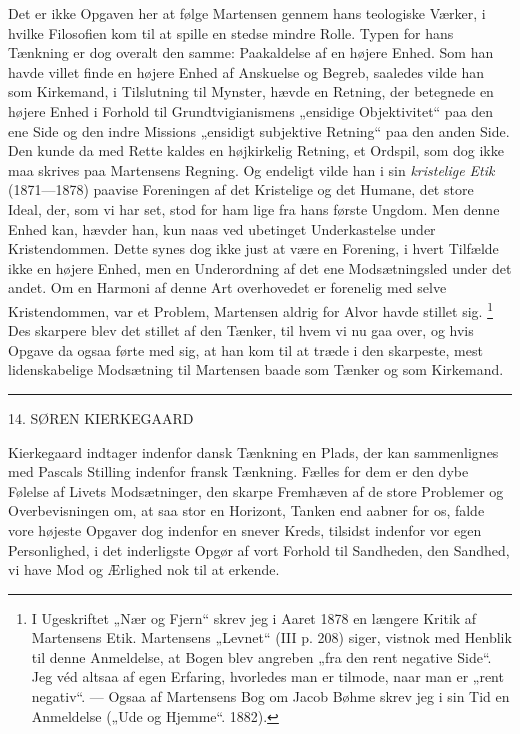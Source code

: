 \documentclass[12pt,a4paper,openany]{book}
\newcommand{\opage}[1]{\marginnote{\footnotesize\textit{[#1]}}}
\begin{document}
Det er ikke Opgaven her at følge Martensen gennem hans teologiske Værker, i
hvilke Filosofien kom til at spille en stedse mindre Rolle. Typen for hans
Tænkning er dog overalt den samme: Paakaldelse af en højere Enhed. Som han
havde villet finde en højere Enhed af Anskuelse og Begreb, saaledes vilde han
som Kirkemand, i Tilslutning til Mynster, hævde en Retning, der betegnede en
højere Enhed i Forhold til Grundtvigianismens „ensidige Objektivitet“ paa den
ene Side og den indre Missions „ensidigt subjektive Retning“ paa den anden
Side. Den kunde da med Rette kaldes en højkirkelig Retning, et Ordspil, som dog
ikke maa skrives paa Martensens Regning. Og endeligt vilde han i sin
\textit{kristelige Etik} (1871---1878) paavise Foreningen af det Kristelige og
det Humane, det store Ideal, der, som vi har set, stod for ham lige fra hans
første Ungdom. Men denne Enhed kan, hævder han, kun naas ved ubetinget
Underkastelse under Kristendommen. Dette synes dog ikke just at være en
Forening, i hvert Tilfælde ikke en højere Enhed, men en Underordning af det ene
Modsætningsled under det andet. Om en Harmoni af denne Art overhovedet er
forenelig med selve Kristendommen, var et Problem, Martensen aldrig for Alvor
havde stillet sig.%
\footnote[1]{I Ugeskriftet „Nær og Fjern“ skrev jeg i Aaret 1878 en længere
Kritik af Martensens Etik. Martensens „Levnet“ (III p. 208) siger, vistnok med
Henblik til denne Anmeldelse, at Bogen blev angreben „fra den rent negative
Side“. Jeg véd altsaa af egen Erfaring, hvorledes man er tilmode, naar man er
„rent negativ“. --- Ogsaa af Martensens Bog om Jacob Bøhme skrev jeg i sin Tid
en Anmeldelse („Ude og Hjemme“. 1882).} Des skarpere blev det stillet af den
Tænker, til hvem
\setcounter{footnote}{0}%
\opage{146}vi nu gaa over, og hvis Opgave da ogsaa førte med sig, at han kom
til at træde i den skarpeste, mest lidenskabelige Modsætning til Martensen
baade som Tænker og som Kirkemand.

\begin{center}\rule{2cm}{0.4pt}\end{center}

\setcounter{footnote}{0}%
\opage{147}

\begin{center}\large 14. SØREN KIERKEGAARD\end{center}

Kierkegaard indtager indenfor dansk Tænkning en Plads, der kan sammenlignes med
Pascals Stilling indenfor fransk Tænkning. Fælles for dem er den dybe Følelse
af Livets Modsætninger, den skarpe Fremhæven af de store Problemer og
Overbevisningen om, at saa stor en Horizont, Tanken end aabner for os, falde
vore højeste Opgaver dog indenfor en snever Kreds, tilsidst indenfor vor egen
Personlighed, i det inderligste Opgør af vort Forhold til Sandheden, den
Sandhed, vi have Mod og Ærlighed nok til at erkende.
\end{document}
